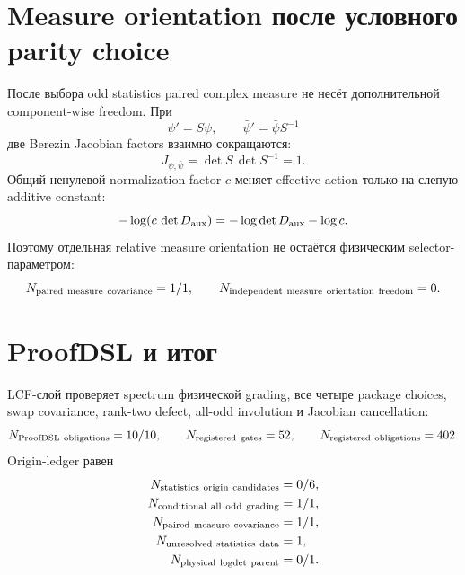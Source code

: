 \section{Measure orientation после условного parity choice}

После выбора odd statistics paired complex measure не несёт дополнительной
component-wise freedom. При
\begin{equation}
 \psi'=S\psi,
 \qquad
 \bar\psi'=\bar\psi S^{-1}
 \label{eq:v9-kms-aux-statistics-dual-change}
\end{equation}
две Berezin Jacobian factors взаимно сокращаются:
\begin{equation}
 J_{\psi,\bar\psi}=\det S\,\det S^{-1}=1.
 \label{eq:v9-kms-aux-statistics-jacobian-cancellation}
\end{equation}
Общий ненулевой normalization factor $c$ меняет effective action только
на слепую additive constant:
\begin{equation}
 -\log\!\left(c\,\det D_{\rm aux}\right)
 =-\log\det D_{\rm aux}-\log c.
 \label{eq:v9-kms-aux-statistics-normalization}
\end{equation}
Поэтому отдельная relative measure orientation не остаётся физическим
selector-параметром:
\begin{equation}
 N_{\rm paired\ measure\ covariance}=1/1,
 \qquad
 N_{\rm independent\ measure\ orientation\ freedom}=0.
 \label{eq:v9-kms-aux-statistics-measure-ledger}
\end{equation}

\section{ProofDSL и итог}

LCF-слой проверяет spectrum физической grading, все четыре package choices,
swap covariance, rank-two defect, all-odd involution и Jacobian cancellation:
\begin{equation}
 N_{\rm ProofDSL\ obligations}=10/10,
 \qquad
 N_{\rm registered\ gates}=52,
 \qquad
 N_{\rm registered\ obligations}=402.
 \label{eq:v9-kms-aux-statistics-proofdsl}
\end{equation}
Origin-ledger равен
\begin{equation}
 \begin{aligned}
 N_{\rm statistics\ origin\ candidates}&=0/6,\\
 N_{\rm conditional\ all\ odd\ grading}&=1/1,\\
 N_{\rm paired\ measure\ covariance}&=1/1,\\
 N_{\rm unresolved\ statistics\ data}&=1,\\
 N_{\rm physical\ logdet\ parent}&=0/1.
 \end{aligned}
 \label{eq:v9-kms-aux-statistics-final-ledger}
\end{equation}

